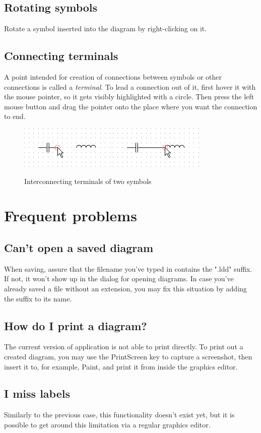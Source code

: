 \documentclass[12pt,oneside,a4paper,titlepage,final]{article}
\theoremstyle{note}
\newcommand*{\uv}[1]{"#1"}
\begin{document}
\subsection{Rotating symbols}
Rotate a symbol inserted into the diagram by right-clicking on it.

\subsection{Connecting terminals}
A point intended for creation of connections between symbols or other connections is called a \emph{terminal}. To lead a connection out of it, first hover it with the mouse pointer, so it gets visibly highlighted with a circle. Then press the left mouse button and drag the pointer onto the place where you want the connection to end.

\begin{figure}[ht]
	\centering
	\includegraphics{create-connection-begin} \hspace{15pt} \includegraphics{create-connection-end}
	\caption{Interconnecting terminals of two symbols}
	\label{create-connection}
\end{figure}

\section{Frequent problems}
\subsection{Can't open a saved diagram}
When saving, assure that the filename you've typed in contains the \uv{.ldd} suffix. If not, it won't show up in the dialog for opening diagrams. In case you've already saved a file without an extension, you may fix this situation by adding the suffix to its name.

\subsection{How do I print a diagram?}
The current version of application is not able to print directly. To print out a created diagram, you may use the PrintScreen key to capture a screenshot, then insert it to, for example, Paint, and print it from inside the graphics editor.

\subsection{I miss labels}
Similarly to the previous case, this functionality doesn't exist yet, but it is possible to get around this limitation via a regular graphics editor.
\end{document}
